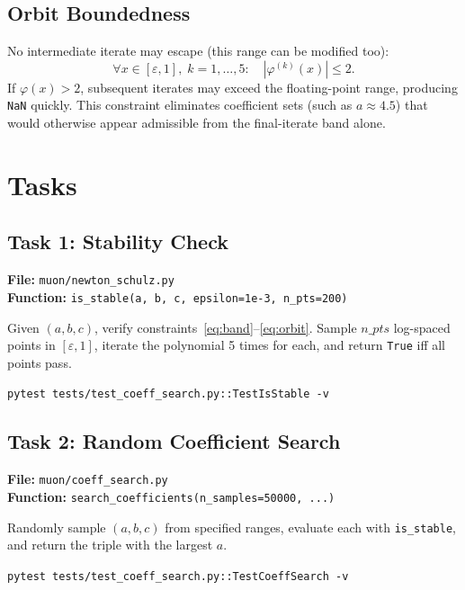 \documentclass[11pt,a4paper]{article}
\newcommand{\poly}{\varphi}
\begin{document}
\subsection{Orbit Boundedness}

No intermediate iterate may escape (this range can be modified too):
\begin{equation}\label{eq:orbit}
\forall x \in [\varepsilon, 1],\; k = 1,\dots,5:
\quad |\poly^{(k)}(x)| \leq 2.
\end{equation}
If $\poly(x) > 2$, subsequent iterates may exceed the floating-point range,
producing \texttt{NaN} quickly.  This constraint eliminates coefficient sets (such as
$a \approx 4.5$) that would otherwise appear admissible from the final-iterate band alone.

\section{Tasks}

\subsection*{Task 1: Stability Check}

\textbf{File:} \texttt{muon/newton\_schulz.py}\\[2pt]
\textbf{Function:} \texttt{is\_stable(a, b, c, epsilon=1e-3, n\_pts=200)}

Given $(a,b,c)$, verify constraints~\eqref{eq:band}--\eqref{eq:orbit}.
Sample $n\_pts$ log-spaced points in $[\varepsilon, 1]$, iterate the
polynomial 5 times for each, and return \texttt{True} iff all points pass.
\begin{mdframed}
    \texttt{pytest tests/test\_coeff\_search.py::TestIsStable -v}
\end{mdframed}

\subsection*{Task 2: Random Coefficient Search}

\textbf{File:} \texttt{muon/coeff\_search.py}\\[2pt]
\textbf{Function:} \texttt{search\_coefficients(n\_samples=50000, ...)}

Randomly sample $(a,b,c)$ from specified ranges, evaluate each with
\texttt{is\_stable}, and return the triple with the largest $a$.

\begin{mdframed}
    \texttt{pytest tests/test\_coeff\_search.py::TestCoeffSearch -v}
\end{mdframed}
\end{document}
